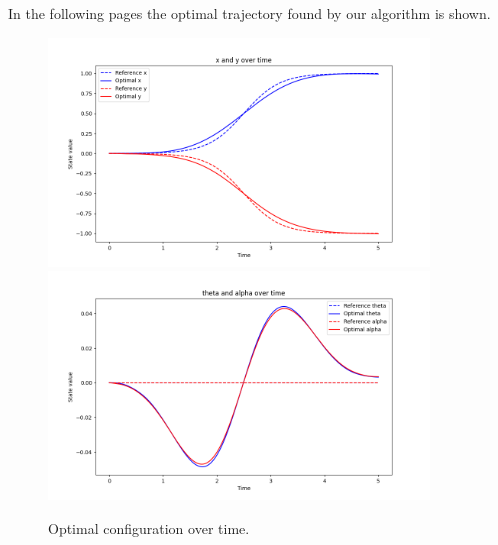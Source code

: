 In the following pages the optimal trajectory found by our algorithm is shown.

\begin{figure}[H]
  \centering
  \includegraphics[width=0.9\textwidth]{pictures/Figure_1_opt_smooth.png}\hfill 
  \includegraphics[width=0.9\textwidth]{pictures/Figure_2_opt_smooth.png}\hfill
  \caption{Optimal configuration over time.}
  \label{fig:Reference trajectory}
\end{figure}

